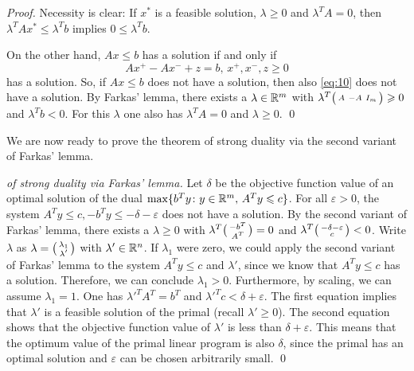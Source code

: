 \begin{proof}
  Necessity is clear: If $x^*$ is a feasible solution, $\lambda\geq0$ and
  $\lambda^TA=0$, then $\lambda^T A x^* \leq\lambda^Tb$  implies $0 \leq \lambda^Tb$. 

  On the other hand, $Ax\leq b$ has a solution if and only if 
  \begin{equation}
    \label{eq:10}
    Ax^+ - Ax^-   + z = b, \, x^+,x^-,z\geq0
  \end{equation}
  has a solution. So, if $Ax\leq b$ does not have a solution, then also
  \eqref{eq:10} does not have a solution. 
  By  Farkas' lemma, 
   there exists a 
  $\lambda \in \mathbb{R}^m$ with $\lambda^T \big(\begin{smallmatrix} A \ -A \ I_m \end{smallmatrix}\big)\geqslant0$ and $\lambda^Tb <0$. 
  For this $\lambda$ one also  has $\lambda^TA = 0$ and  $\lambda\geq0$.
\qed
\end{proof}

We are now ready to prove the theorem of strong duality via the second
variant of Farkas' lemma. %

\begin{proof}[of strong duality  via Farkas' lemma]
  Let $\delta$ be the
  objective function value of an optimal solution of the dual
  $\max\{b^T y \colon y \in \mathbb{R}^m, \, A^Ty \leqslant c\}$. 
  For all $\varepsilon>0$, the system $A^T y \leq c, -b^Ty \leq - \delta -\varepsilon$ does not have
  a solution. By the second variant of Farkas' lemma,
  there exists a $\lambda\geq0$ with $\lambda^T \big(\begin{smallmatrix} -b^T \\ 
    A^T \end{smallmatrix}\big) = 0$ and $\lambda^T \big(\begin{smallmatrix} -\delta -\varepsilon \\ c \end{smallmatrix}\big)<0$. 
  Write $\lambda$ as
  $\lambda = \big(\begin{smallmatrix} \lambda_1 \\ \lambda' \end{smallmatrix}\big)$ with $\lambda' \in \mathbb{R}^n$.  
  If $\lambda_1$ were zero, we could apply the second variant of Farkas' lemma
  to the system $A^Ty \leq c$ and $\lambda'$, since we know that $A^Ty \leq c$ has a solution.
  Therefore, we can conclude $\lambda_1 > 0$.
  Furthermore, by scaling, we can assume $\lambda_1 =
  1$. One has $\lambda'^TA^T = b^T$ and $\lambda'^Tc < \delta+\varepsilon$. The first
  equation implies that $\lambda'$ is a feasible solution of the
  primal (recall $\lambda'\geq0$). The second equation shows that the objective function value
  of $\lambda'$ is less than $\delta+\varepsilon$. This means that 
  the optimum value of the  primal linear program is also $\delta$,
  since the primal has an optimal solution 
  and $\varepsilon$ can be chosen arbitrarily small. 
  \qed
\end{proof}




